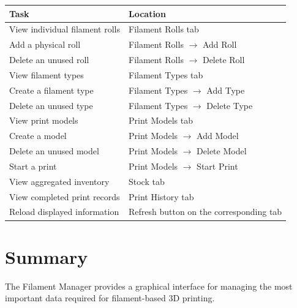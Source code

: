 \documentclass[a4paper,11pt]{article}
\begin{document}
\begin{tabularx}{\linewidth}{@{}p{4.2cm}X@{}}
\toprule
\textbf{Task} & \textbf{Location} \\
\midrule

View individual filament rolls
  & Filament Rolls tab \\

Add a physical roll
  & Filament Rolls $\rightarrow$ Add Roll \\

Delete an unused roll
  & Filament Rolls $\rightarrow$ Delete Roll \\

View filament types
  & Filament Types tab \\

Create a filament type
  & Filament Types $\rightarrow$ Add Type \\

Delete an unused type
  & Filament Types $\rightarrow$ Delete Type \\

View print models
  & Print Models tab \\

Create a model
  & Print Models $\rightarrow$ Add Model \\

Delete an unused model
  & Print Models $\rightarrow$ Delete Model \\

Start a print
  & Print Models $\rightarrow$ Start Print \\

View aggregated inventory
  & Stock tab \\

View completed print records
  & Print History tab \\

Reload displayed information
  & Refresh button on the corresponding tab \\

\bottomrule
\end{tabularx}

\section{Summary}

The Filament Manager provides a graphical interface for managing the most
important data required for filament-based 3D printing.
\end{document}
